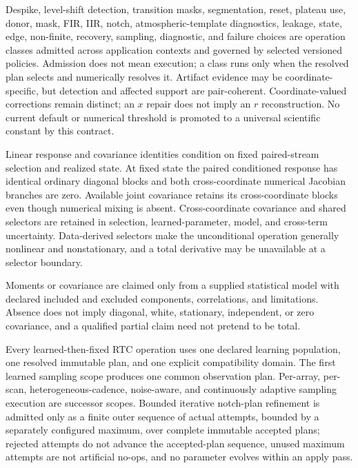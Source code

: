 \begin{description}[style=nextline,leftmargin=1em,labelindent=0pt,
  labelwidth=0pt,labelsep=0pt]
\item[SCI-RTC-ASM-005 -- Selected-policy boundary.]
Despike, level-shift detection, transition masks, segmentation, reset,
plateau use, donor, mask, FIR, IIR, notch, atmospheric-template diagnostics, leakage,
state, edge, non-finite, recovery, sampling, diagnostic, and failure choices
are operation classes admitted across application contexts and governed by
selected versioned policies.  Admission does not mean execution; a class runs
only when the resolved plan selects and numerically resolves it.
Artifact evidence may be coordinate-specific, but detection and affected
support are pair-coherent.  Coordinate-valued corrections remain distinct;
an $x$ repair does not imply an $r$ reconstruction.
No current default or numerical threshold is promoted to a universal
scientific constant by this contract.

\item[SCI-RTC-ASM-006 -- Conditional linearity.]
Linear response and covariance identities condition on fixed paired-stream
selection and realized state.  At fixed state the paired conditioned response
has identical ordinary diagonal blocks and both cross-coordinate numerical
Jacobian branches are zero.  Available joint covariance retains its cross-coordinate blocks even
though numerical mixing is absent.  Cross-coordinate covariance and shared
selectors are retained in selection, learned-parameter, model, and cross-term
uncertainty.  Data-derived selectors make the unconditional operation generally
nonlinear and nonstationary, and a total derivative may be unavailable at a
selector boundary.

\item[SCI-RTC-ASM-007 -- Statistical input.]
Moments or covariance are claimed only from a supplied statistical model with
declared included and excluded components, correlations, and limitations.
Absence does not imply diagonal, white, stationary, independent, or zero
covariance, and a qualified partial claim need not pretend to be total.

\item[SCI-RTC-ASM-008 -- Learned-mode scope.]
Every learned-then-fixed RTC operation uses one declared learning population,
one resolved immutable plan, and one explicit compatibility domain.  The
first learned sampling scope produces one common observation plan.  Per-array,
per-scan, heterogeneous-cadence, noise-aware, and continuously adaptive
sampling execution are successor scopes.
Bounded iterative notch-plan refinement is admitted only as a finite outer
sequence of actual attempts, bounded by a separately configured maximum, over
complete immutable accepted plans; rejected attempts do not advance the
accepted-plan sequence, unused maximum attempts are not artificial no-ops,
and no parameter evolves within an apply pass.


\end{description}
